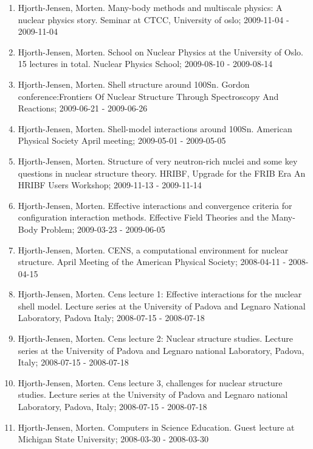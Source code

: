 \documentclass[%
oneside,                 %
final,                   %
10pt]{article}
\begin{document}
\begin{enumerate}
\item Hjorth-Jensen, Morten.  Many-body methods and multiscale physics: A nuclear physics story. Seminar at CTCC, University of oslo; 2009-11-04 - 2009-11-04

\item Hjorth-Jensen, Morten. School on Nuclear Physics at the University of Oslo. 15 lectures in total. Nuclear Physics School; 2009-08-10 - 2009-08-14

\item Hjorth-Jensen, Morten.  Shell structure around 100Sn. Gordon conference:Frontiers Of Nuclear Structure Through Spectroscopy And Reactions; 2009-06-21 - 2009-06-26

\item Hjorth-Jensen, Morten.  Shell-model interactions around 100Sn. American Physical Society April meeting; 2009-05-01 - 2009-05-05

\item Hjorth-Jensen, Morten.  Structure of very neutron-rich nuclei and some key questions in nuclear structure theory. HRIBF, Upgrade for the FRIB Era An HRIBF Users Workshop; 2009-11-13 - 2009-11-14

\item Hjorth-Jensen, Morten. Effective interactions and convergence criteria for configuration interaction methods. Effective Field Theories and the Many-Body Problem; 2009-03-23 - 2009-06-05

\item Hjorth-Jensen, Morten.  CENS, a computational environment for nuclear structure. April Meeting of the American Physical Society; 2008-04-11 - 2008-04-15

\item Hjorth-Jensen, Morten.  Cens lecture 1: Effective interactions for the nuclear shell model. Lecture series at the University of Padova and Legnaro National Laboratory, Padova Italy; 2008-07-15 - 2008-07-18

\item Hjorth-Jensen, Morten.  Cens lecture 2: Nuclear structure studies. Lecture series at the University of Padova and Legnaro national Laboratory, Padova, Italy; 2008-07-15 - 2008-07-18

\item Hjorth-Jensen, Morten.  Cens lecture 3, challenges for nuclear structure studies. Lecture series at the University of Padova and Legnaro national Laboratory, Padova, Italy; 2008-07-15 - 2008-07-18

\item Hjorth-Jensen, Morten.  Computers in Science Education. Guest lecture at Michigan State University; 2008-03-30 - 2008-03-30


\end{enumerate}
\end{document}
